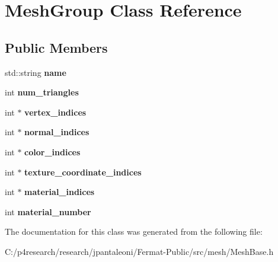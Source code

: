\hypertarget{class_mesh_group}{}\section{Mesh\+Group Class Reference}
\label{class_mesh_group}
\subsection*{Public Members}
\begin{DoxyCompactItemize}
\item 
\mbox{\label{class_mesh_group_a0c249a500b8f7a0262ca9bd77596e75a}} 
std\+::string {\bfseries name}
\item 
\mbox{\label{class_mesh_group_a4b9095a570997b2d82c36b317967395b}} 
int {\bfseries num\+\_\+triangles}
\item 
\mbox{\label{class_mesh_group_a7707177ef409bd175c918632fc9e9111}} 
int $\ast$ {\bfseries vertex\+\_\+indices}
\item 
\mbox{\label{class_mesh_group_a8e370c787784ccbf44dc15ad576cd68f}} 
int $\ast$ {\bfseries normal\+\_\+indices}
\item 
\mbox{\label{class_mesh_group_a94a17f1b4cc8414502e911bb956eb087}} 
int $\ast$ {\bfseries color\+\_\+indices}
\item 
\mbox{\label{class_mesh_group_a658b8e233e6d0451fb7eeb6c18a64db6}} 
int $\ast$ {\bfseries texture\+\_\+coordinate\+\_\+indices}
\item 
\mbox{\label{class_mesh_group_a8c5de1549a0bbe0cecb2f015fe8696f2}} 
int $\ast$ {\bfseries material\+\_\+indices}
\item 
\mbox{\label{class_mesh_group_a5caca260e5d72b8998c67649b3210c1e}} 
int {\bfseries material\+\_\+number}
\end{DoxyCompactItemize}


The documentation for this class was generated from the following file\+:\begin{DoxyCompactItemize}
\item 
C\+:/p4research/research/jpantaleoni/\+Fermat-\/\+Public/src/mesh/Mesh\+Base.\+h\end{DoxyCompactItemize}
